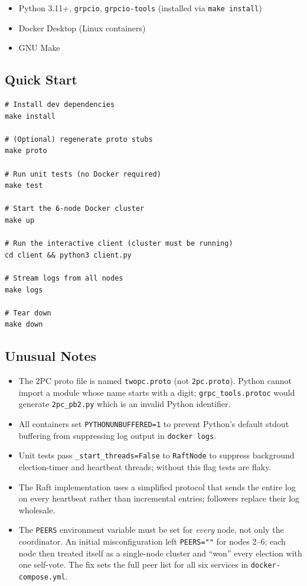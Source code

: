 \documentclass[11pt]{article}
\begin{document}
\begin{itemize}
  \item Python 3.11+, \texttt{grpcio}, \texttt{grpcio-tools} (installed via \texttt{make install})
  \item Docker Desktop (Linux containers)
  \item GNU Make
\end{itemize}

\subsection{Quick Start}

\begin{lstlisting}[caption={Build and start the 6-node cluster.}]
# Install dev dependencies
make install

# (Optional) regenerate proto stubs
make proto

# Run unit tests (no Docker required)
make test

# Start the 6-node Docker cluster
make up

# Run the interactive client (cluster must be running)
cd client && python3 client.py

# Stream logs from all nodes
make logs

# Tear down
make down
\end{lstlisting}

\subsection{Unusual Notes}

\begin{itemize}
  \item The 2PC proto file is named \texttt{twopc.proto} (not \texttt{2pc.proto}).
    Python cannot import a module whose name starts with a digit;
    \texttt{grpc\_tools.protoc} would generate \texttt{2pc\_pb2.py} which is an invalid
    Python identifier.
  \item All containers set \texttt{PYTHONUNBUFFERED=1} to prevent Python's default
    stdout buffering from suppressing log output in \texttt{docker logs}.
  \item Unit tests pass \texttt{\_start\_threads=False} to \texttt{RaftNode} to suppress
    background election-timer and heartbeat threads; without this flag tests are flaky.
  \item The Raft implementation uses a simplified protocol that sends the entire log on
    every heartbeat rather than incremental entries; followers replace their log wholesale.
  \item The \texttt{PEERS} environment variable must be set for \emph{every} node, not
    only the coordinator.  An initial misconfiguration left \texttt{PEERS=""} for nodes
    2--6; each node then treated itself as a single-node cluster and ``won'' every
    election with one self-vote.  The fix sets the full peer list for all six services
    in \texttt{docker-compose.yml}.
\end{itemize}
\end{document}

